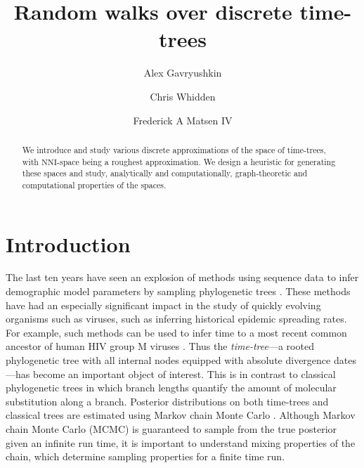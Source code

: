 \documentclass{amsart}
\theoremstyle{definition}
\newcommand{\nni}{\mathrm{NNI}}
\begin{document}
\title{Random walks over discrete time-trees}

\author{Alex Gavryushkin}
\address{Department of Computer Science, The University of Auckland, New Zealand}

\author{Chris Whidden}
\address{Program in Computational Biology, Fred Hutchinson Cancer Research Center, Seattle, WA 98109}

\author{Frederick A Matsen IV}


\begin{abstract}
We introduce and study various discrete approximations of the space of time-trees, with $\nni$-space being a roughest approximation.
We design a heuristic for generating these spaces and study, analytically and computationally, graph-theoretic and computational properties of the spaces.
\iftoggle{curvatureON}{
We also investigate the Ricci-Ollivier curvature of basic random walks on the spaces.
}{}
\end{abstract}


\maketitle


\section{Introduction}
The last ten years have seen an explosion of methods using sequence data to infer demographic model parameters by sampling phylogenetic trees \autocite{Kuhner1995-mj,Kuhner1998-tq,Kuhner2000-af,Beerli2001-sc,Kuhner2006-vx,Drummond2002,Drummond2005-ks,Drummond2006-oa,Minin2008-wz}.
These methods have had an especially significant impact in the study of quickly evolving organisms such as viruses, such as inferring historical epidemic spreading rates.
For example, such methods can be used to infer time to a most recent common ancestor of human HIV group M viruses \autocite{Worobey2008-rt,Baele2013-op}.
Thus the {\em time-tree}---a rooted phylogenetic tree with all internal nodes equipped with absolute divergence dates---has become an important object of interest.
This is in contrast to classical phylogenetic trees in which branch lengths quantify the amount of molecular substitution along a branch.
Posterior distributions on both time-trees and classical trees are estimated using Markov chain Monte Carlo \autocite{Mau1997-sq,Yang1997-gv,Drummond2002}.
Although Markov chain Monte Carlo (MCMC) is guaranteed to sample from the true posterior given an infinite run time, it is important to understand mixing properties of the chain, which determine sampling properties for a finite time run.
\end{document}
